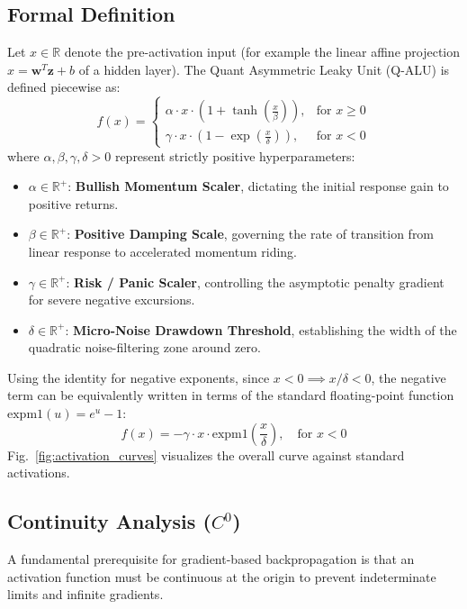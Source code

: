 \documentclass[conference]{IEEEtran}
\begin{document}
\subsection{Formal Definition}
Let $x \in \mathbb{R}$ denote the pre-activation input (for example the linear affine projection $x = \mathbf{w}^T \mathbf{z} + b$ of a hidden layer). The Quant Asymmetric Leaky Unit (Q-ALU) is defined piecewise as:
\begin{equation}
f(x) = \begin{cases} 
\alpha \cdot x \cdot \left( 1 + \tanh\left(\frac{x}{\beta}\right) \right), & \text{for } x \ge 0 \\ 
\gamma \cdot x \cdot \left( 1 - \exp\left(\frac{x}{\delta}\right) \right), & \text{for } x < 0 
\end{cases}
\label{eq:qalu_definition}
\end{equation}
where $\alpha, \beta, \gamma, \delta > 0$ represent strictly positive hyperparameters:
\begin{itemize}
    \item $\alpha \in \mathbb{R}^+$: \textbf{Bullish Momentum Scaler}, dictating the initial response gain to positive returns.
    \item $\beta \in \mathbb{R}^+$: \textbf{Positive Damping Scale}, governing the rate of transition from linear response to accelerated momentum riding.
    \item $\gamma \in \mathbb{R}^+$: \textbf{Risk / Panic Scaler}, controlling the asymptotic penalty gradient for severe negative excursions.
    \item $\delta \in \mathbb{R}^+$: \textbf{Micro-Noise Drawdown Threshold}, establishing the width of the quadratic noise-filtering zone around zero.
\end{itemize}

Using the identity for negative exponents, since $x < 0 \implies x/\delta < 0$, the negative term can be equivalently written in terms of the standard floating-point function $\text{expm1}(u) = e^u - 1$:
\begin{equation}
f(x) = -\gamma \cdot x \cdot \text{expm1}\left(\frac{x}{\delta}\right), \quad \text{for } x < 0
\end{equation}
Fig.~\ref{fig:activation_curves} visualizes the overall curve against standard activations.

\subsection{Continuity Analysis ($C^0$)}
A fundamental prerequisite for gradient-based backpropagation is that an activation function must be continuous at the origin to prevent indeterminate limits and infinite gradients.
\end{document}
